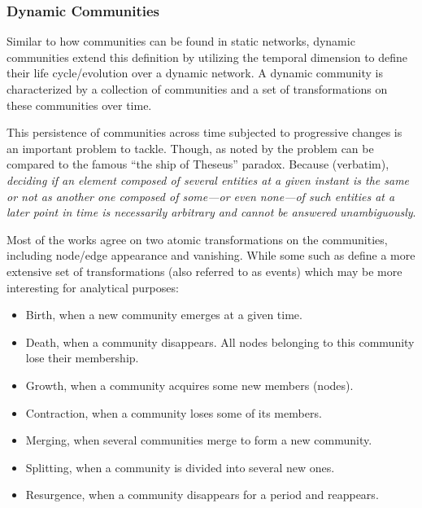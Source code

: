 \documentclass[
acmsmall,
nonacm,
screen,
acmthm]{../../scripts/pandoc/templates/acmart}
\providecommand{\tightlist}{%
\setlength{\itemsep}{0pt}\setlength{\parskip}{0pt}}
\begin{document}
\hypertarget{dynamic-communities}{%
\subsubsection{Dynamic Communities}\label{dynamic-communities}}

Similar to how communities can be found in static networks, dynamic
communities extend this definition by utilizing the temporal dimension
to define their life cycle/evolution over a dynamic network. A dynamic
community is characterized by a collection of communities and a set of
transformations on these communities over time.

This persistence of communities across time subjected to progressive
changes is an important problem to tackle. Though, as noted by
\citep{rossettiCommunityDiscoveryDynamic2018} the problem can be
compared to the famous ``the ship of Theseus'' paradox. Because
(verbatim), \emph{deciding if an element composed of several entities at
a given instant is the same or not as another one composed of some---or
even none---of such entities at a later point in time is necessarily
arbitrary and cannot be answered unambiguously}.

Most of the works agree on two atomic transformations on the
communities, including node/edge appearance and vanishing. While some
such as
\citep{pallaQuantifyingSocialGroup2007, asurEventbasedFrameworkCharacterizing2009, cazabetUsingDynamicCommunity2012}
define a more extensive set of transformations (also referred to as
events) which may be more interesting for analytical purposes:

\begin{itemize}
\tightlist
\item
  Birth, when a new community emerges at a given time.~
\item
  Death, when a community disappears. All nodes belonging to this
  community lose their membership.
\item
  Growth, when a community acquires some new members (nodes).
\item
  Contraction, when a community loses some of its members.
\item
  Merging, when several communities merge to form a new community.
\item
  Splitting, when a community is divided into several new ones.
\item
  Resurgence, when a community disappears for a period and reappears.
\end{itemize}
\end{document}
